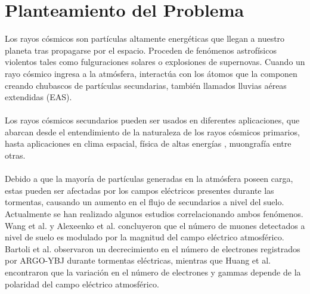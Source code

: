 \documentclass[12pt,a4paper,oneside]{book}
\begin{document}
\large 

\newpage

\newpage 
\chapter{Planteamiento del Problema}
Los rayos cósmicos son partículas altamente energéticas que llegan a nuestro planeta tras propagarse por el espacio. Proceden de fenómenos astrofísicos violentos tales como fulguraciones solares o explosiones de supernovas. Cuando un rayo cósmico ingresa a la atmósfera, interactúa con los átomos que la componen creando chubascos de partículas secundarias, también llamados lluvias aéreas extendidas (EAS).\\\\
Los rayos cósmicos secundarios pueden ser usados en diferentes aplicaciones, que abarcan desde el entendimiento de la naturaleza de los rayos cósmicos primarios, hasta aplicaciones en clima espacial, física de altas energías \cite{Spurio2015}, muongrafía \cite{kaiser2018muography} entre otras.\\\\
Debido a que la mayoría de partículas generadas en la atmósfera poseen carga, estas pueden ser afectadas por los campos eléctricos presentes durante las tormentas, causando un aumento en el flujo de secundarios a nivel del suelo. Actualmente se han realizado algunos estudios correlacionando ambos fenómenos. Wang et al. \cite{wang2012effect} y Alexeenko et al. \cite{alexeenko2002transient} concluyeron que el número de muones detectados a nivel de suelo es modulado por la magnitud del campo eléctrico atmosférico. Bartoli et al. \cite{bartoli2018observation} observaron un decrecimiento en el número de electrones registrados por ARGO-YBJ durante tormentas eléctricas, mientras que Huang et al. \cite{zhao2019effects} encontraron que la variación en el número de electrones y gammas depende de la polaridad del campo eléctrico atmosférico.\\\\
\end{document}
